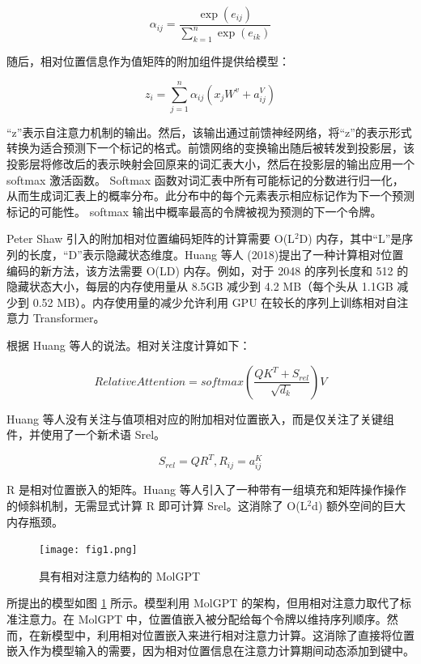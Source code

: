 \begin{equation}
  \alpha_{ij} = \frac{\exp \left( e_{ij} \right)}{\sum_{k=1}^n \exp \left( e_{ik} \right)}
\end{equation}

随后，相对位置信息作为值矩阵的附加组件提供给模型：

\begin{equation}
  z_i = \sum_{j=1}^n \alpha_{ij} \left( x_jW^{v} + a_{ij}^V \right)
\end{equation}

“z”表示自注意力机制的输出。然后，该输出通过前馈神经网络，将“z”的表示形式转换为适合预测下一个标记的格式。前馈网络的变换输出随后被转发到投影层，该投影层将修改后的表示映射会回原来的词汇表大小，然后在投影层的输出应用一个 softmax 激活函数。 Softmax 函数对词汇表中所有可能标记的分数进行归一化，从而生成词汇表上的概率分布。此分布中的每个元素表示相应标记作为下一个预测标记的可能性。 softmax 输出中概率最高的令牌被视为预测的下一个令牌。

Peter Shaw 引入的附加相对位置编码矩阵的计算需要 O(L$^2$D) 内存，其中“L”是序列的长度，“D”表示隐藏状态维度。Huang 等人 (2018)提出了一种计算相对位置编码的新方法，该方法需要 O(LD) 内存。例如，对于 2048 的序列长度和 512 的隐藏状态大小，每层的内存使用量从 8.5GB 减少到 4.2 MB（每个头从 1.1GB 减少到 0.52 MB）。内存使用量的减少允许利用 GPU 在较长的序列上训练相对自注意力 Transformer。

根据 Huang 等人的说法。相对关注度计算如下：

\begin{equation}
  Relative Attention = softmax \left( \frac{QK^T + S_{rel}}{\sqrt{d_k}} \right)V
\end{equation}

Huang 等人没有关注与值项相对应的附加相对位置嵌入，而是仅关注了关键组件，并使用了一个新术语 Srel。

\begin{equation}
  S_{rel} = QR^T, R_{ij} = a_{ij}^K
\end{equation}

R 是相对位置嵌入的矩阵。Huang 等人引入了一种带有一组填充和矩阵操作操作的倾斜机制，无需显式计算 R 即可计算 Srel。这消除了 O(L$^2$d) 额外空间的巨大内存瓶颈。

\begin{figure}[H]
  \centering
  \texttt{[image: fig1.png]}
  \caption{具有相对注意力结构的 MolGPT}
  \label{fig:1}
\end{figure}


所提出的模型如图 \ref{fig:1} 所示。模型利用 MolGPT 的架构，但用相对注意力取代了标准注意力。在 MolGPT 中，位置值嵌入被分配给每个令牌以维持序列顺序。然而，在新模型中，利用相对位置嵌入来进行相对注意力计算。这消除了直接将位置嵌入作为模型输入的需要，因为相对位置信息在注意力计算期间动态添加到键中。

